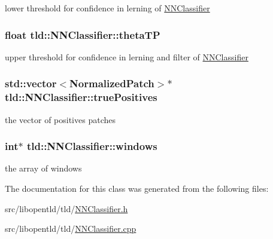lower threshold for confidence in lerning of \hyperlink{classtld_1_1NNClassifier}{N\-N\-Classifier} 

\hypertarget{classtld_1_1NNClassifier_aada6ca01c7b5224439e375444947cd16}{
\subsubsection[{theta\-T\-P}]{\setlength{\rightskip}{0pt plus 5cm}float tld\-::\-N\-N\-Classifier\-::theta\-T\-P}}\label{classtld_1_1NNClassifier_aada6ca01c7b5224439e375444947cd16}


upper threshold for confidence in lerning and filter of \hyperlink{classtld_1_1NNClassifier}{N\-N\-Classifier} 

\hypertarget{classtld_1_1NNClassifier_ac17849309a8aed1fdc3e3247f22b5fa2}{
\subsubsection[{true\-Positives}]{\setlength{\rightskip}{0pt plus 5cm}std\-::vector$<${\bf Normalized\-Patch}$>$$\ast$ tld\-::\-N\-N\-Classifier\-::true\-Positives}}\label{classtld_1_1NNClassifier_ac17849309a8aed1fdc3e3247f22b5fa2}


the vector of positives patches 

\hypertarget{classtld_1_1NNClassifier_a6a4aab5ed014405c9dbd9162af1b1d7c}{
\subsubsection[{windows}]{\setlength{\rightskip}{0pt plus 5cm}int$\ast$ tld\-::\-N\-N\-Classifier\-::windows}}\label{classtld_1_1NNClassifier_a6a4aab5ed014405c9dbd9162af1b1d7c}


the array of windows 



The documentation for this class was generated from the following files\-:\begin{DoxyCompactItemize}
\item 
src/libopentld/tld/\hyperlink{NNClassifier_8h}{N\-N\-Classifier.\-h}\item 
src/libopentld/tld/\hyperlink{NNClassifier_8cpp}{N\-N\-Classifier.\-cpp}\end{DoxyCompactItemize}
